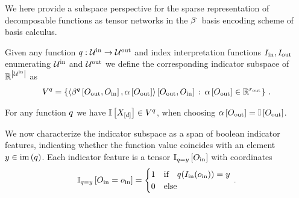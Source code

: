 \label{sec:indicatorFeatures}

We here provide a subspace perspective for the sparse representation of decomposable functions as tensor networks in the $\beta^{\cdot}$ basis encoding scheme of basis calculus.

\begin{definition}
    Given any function $q:\mathcal{U}^{\mathrm{in}}\rightarrow\mathcal{U}^{\mathrm{out}}$ and index interpretation functions $I_{\mathrm{in}},I_{\mathrm{out}}$ enumerating $\mathcal{U}^{\mathrm{in}}$ and $\mathcal{U}^{\mathrm{out}}$ we define the corresponding indicator subspace of $\mathbb{R}^{\left|\mathcal{U}^{\mathrm{in}}\right|}$ as
    \begin{align*}
        V^{q}
        = \left\{ \left\langle 
            \beta^{q}\left[O_{\mathrm{out}},O_{\mathrm{in}}\right],\alpha\left[O_{\mathrm{out}}\right]
        \right\rangle \left[ O_{\mathrm{out}},O_{\mathrm{in}} \right] \, : \, \alpha\left[O_{\mathrm{out}}\right] \in \mathbb{R}^{r_{\mathrm{out}}}
        \right\} \, .
    \end{align*}
\end{definition}

For any function $q$ we have $\mathbb{I}\left[X_{[d]}\right]\in V^{q}$, when choosing $\alpha\left[O_{\mathrm{out}}\right]=\mathbb{I}\left[O_{\mathrm{out}}\right]$.

We now characterize the indicator subspace as a span of boolean indicator features, indicating whether the function value coincides with an element $y\in\mathrm{im}\left(q\right)$.
Each indicator feature is a tensor $\mathbb{I}_{q=y}\left[O_{\mathrm{in}}\right]$ with coordinates
\begin{align*}
    \mathbb{I}_{q=y}\left[O_{\mathrm{in}}=o_{\mathrm{in}}\right]
    = \begin{cases}
          1 & \text{if} \quad q(I_{\mathrm{in}}(o_{\mathrm{in}}))=y \\
          0 & \text{else}
    \end{cases} \, .
\end{align*}

